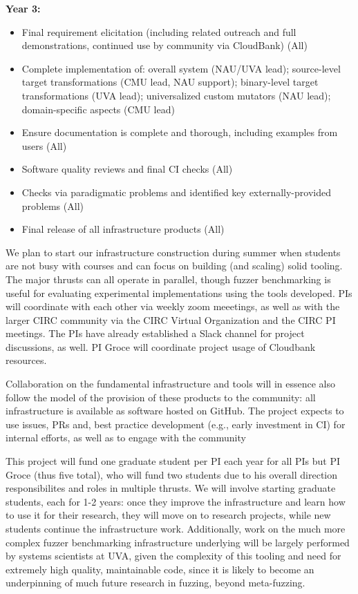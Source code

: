 \noindent\textbf{Year 3:}
\begin{itemize}[labelwidth=0.7em, labelsep=0.6em, topsep=0ex, itemsep=0ex,
  parsep=0ex, leftmargin=1.5em]
  \item Final requirement elicitation (including related outreach and 
    full demonstrations, continued use by community via CloudBank) (All)   
\item Complete implementation of: overall system (NAU/UVA lead); source-level target transformations
    (CMU lead, NAU support); binary-level target
    transformations (UVA lead); universalized custom mutators
      (NAU lead); domain-specific
        aspects (CMU lead)
  \item Ensure documentation is complete and thorough, including
    examples from users (All)    
  \item Software quality reviews and final CI checks (All)
    \item Checks via paradigmatic problems and identified key
      externally-provided problems (All)
    \item Final release of all infrastructure products (All)
\end{itemize}

 We plan to start our
infrastructure construction during summer when students are
not busy with courses and can focus on
building (and scaling) solid tooling.  The major thrusts can all operate in 
parallel, though fuzzer benchmarking is useful for evaluating experimental 
implementations using the tools developed.  PIs will coordinate with
each other via
weekly zoom meeetings, as well as with the larger CIRC community via the
CIRC Virtual Organization and the CIRC PI meetings.  The PIs have
already established a Slack channel for project discussions, as well.
PI Groce will coordinate project usage of Cloudbank resources.

Collaboration on the fundamental infrastructure and tools will in
essence also follow the model of the provision of these products to
the community: all infrastructure is available as software hosted on
GitHub.  The project expects to use issues, PRs and, best practice
development (e.g., early investment in CI)
for internal efforts, as well as to engage with the community


This project will fund one graduate student per PI each year for all
PIs but PI Groce (thus five total), who will fund two students due to his overall
direction responsibilites and roles in multiple thrusts.   We will
involve starting graduate students, each for 1-2 years: once they
improve the infrastructure and learn how to use it for their research,
they will move on to research projects, while new
students continue the infrastructure work.  Additionally, work on the much more 
complex fuzzer benchmarking infrastructure underlying will be largely performed 
by systems scientists at UVA, given the complexity of this tooling and need for 
extremely high quality, maintainable code, since it is likely to become an 
underpinning of much future research in fuzzing, beyond meta-fuzzing.



